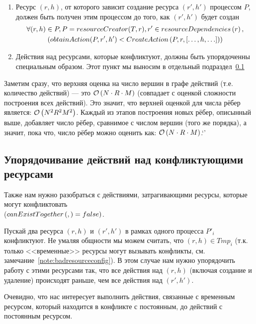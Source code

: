 \begin{enumerate}
	\item \label{chap2:preced:f} \label{chap2:preced:lastSimple} Ресурс $(r, h)$, от которого зависит создание ресурса $(r', h')$ процессом $P$, должен быть получен этим процессом до того, как $(r', h')$ будет создан
		\begin{gather*}
			\forall (r, h) \in P, P = resourceCreator(T, r), r' \in resourceDependencies\left( r \right), \\
			(obtainAction(P, r', h') < CreateAction\left( P, r, [\ldots, h, \ldots] \right))
		\end{gather*}

	\item \label{chap2:preced:g} Действия над ресурсами, которые конфликтуют, должны быть упорядоченны специальным образом. Этот пункт мы выносим в отдельный подраздел~\ref{chap2:subsec:conflictresolution}
\end{enumerate}

Заметим сразу, что верхняя оценка на число вершин в графе действий (т.е. количество действий) --- это $\mathcal{O}\left(N \cdot R \cdot M\right)$ (совпадает с оценкой сложности построения всех действий). Это значит, что верхней оценкой для числа рёбер является: $\mathcal{O}\left(N^2R^2M^2\right)$. Каждый из этапов построения новых рёбер, описынный выше, добавляет число рёбер, сравнимое с числом вершин (того же порядка), а значит, пока что, число рёбер можно оценить как: $\mathcal{O}\left(N\cdot R \cdot M\right)$.`'

\subsection{Упорядочивание действий над конфликтующими ресурсами}
\label{chap2:subsec:conflictresolution}

Также нам нужно разобраться с действиями, затрагивающими ресурсы, которые могут конфликтовать \\
($canExistTogether\left( ,  \right) = false)$. 

Пускай два ресурса $(r, h)$ и $(r', h')$ в рамках одного процесса $P'_i$ конфликтуют. 
Не умаляя общности мы можем считать, что $(r, h) \in Tmp_i$ 
(т.к. только <<временные>> ресурсы могут вызывать конфликты, см. замечание~\ref{note:badresourceconfig}). 
В этом случае нам нужно упорядочить работу с этими ресурсами так, что все действия над $(r, h)$ 
(включая создание и удаление) происходят раньше, чем все действия над $(r', h')$.

Очевидно, что нас интересует выполнить действия, связанные с временным ресурсом, который находится в конфликте с постоянным, до действий с постоянным ресурсом.

